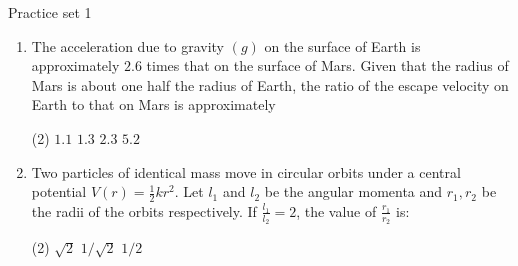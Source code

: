  
 \newpage
 \begin{abox}
 	Practice set 1
 	\end{abox}
 \begin{enumerate}
 	\item The acceleration due to gravity $(g)$ on the surface of Earth is approximately $2.6$ times that on the surface of Mars. Given that the radius of Mars is about one half the radius of Earth, the ratio of the escape velocity on Earth to that on Mars is approximately
 	{}
 \begin{tasks}(2)
 	\task[\textbf{A.}] $1.1$
 	\task[\textbf{B.}]$1.3$
 	\task[\textbf{C.}]$2.3$
 	\task[\textbf{D.}]$5.2$
 \end{tasks}
	\item Two particles of identical mass move in circular orbits under a central potential $V(r)=\frac{1}{2} k r^{2}$. Let $l_{1}$ and $l_{2}$ be the angular momenta and $r_{1}, r_{2}$ be the radii of the orbits respectively. If $\frac{l_{1}}{l_{2}}=2$, the value of $\frac{r_{1}}{r_{2}}$ is:
	{}
\begin{tasks}(2)
	\task[\textbf{A.}] $\sqrt{2}$
	\task[\textbf{B.}]$1 / \sqrt{2}$
	\task[\textbf{D.}] $1 / 2$
\end{tasks}


\end{enumerate}
